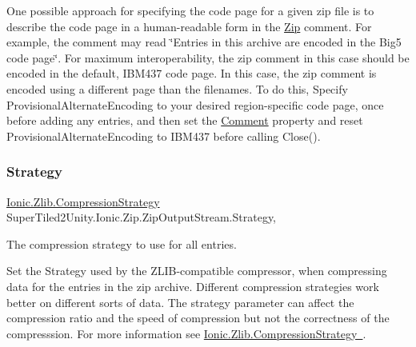 One possible approach for specifying the code page for a given zip file is to describe the code page in a human-\/readable form in the \mbox{\hyperlink{namespace_super_tiled2_unity_1_1_ionic_1_1_zip}{Zip}} comment. For example, the comment may read \char`\"{}\+Entries in this archive are encoded in the
  Big5 code page\char`\"{}. For maximum interoperability, the zip comment in this case should be encoded in the default, I\+B\+M437 code page. In this case, the zip comment is encoded using a different page than the filenames. To do this, Specify {\ttfamily Provisional\+Alternate\+Encoding} to your desired region-\/specific code page, once before adding any entries, and then set the \mbox{\hyperlink{class_super_tiled2_unity_1_1_ionic_1_1_zip_1_1_zip_output_stream_a36027bbb7ea2355884a7922b429a3913}{Comment}} property and reset {\ttfamily Provisional\+Alternate\+Encoding} to I\+B\+M437 before calling {\ttfamily Close()}. \mbox{\label{class_super_tiled2_unity_1_1_ionic_1_1_zip_1_1_zip_output_stream_a14669ca8951ced9c7ce418b0e813b77a}} 
\subsubsection{\texorpdfstring{Strategy}{Strategy}}
{\footnotesize\ttfamily \mbox{\hyperlink{namespace_super_tiled2_unity_1_1_ionic_1_1_zlib_abde5c10a1e2ee453e1e8e22e79a39a3b}{Ionic.\+Zlib.\+Compression\+Strategy}} Super\+Tiled2\+Unity.\+Ionic.\+Zip.\+Zip\+Output\+Stream.\+Strategy\hspace{0.3cm}{\ttfamily [get]}, {\ttfamily [set]}}



The compression strategy to use for all entries. 

Set the Strategy used by the Z\+L\+I\+B-\/compatible compressor, when compressing data for the entries in the zip archive. Different compression strategies work better on different sorts of data. The strategy parameter can affect the compression ratio and the speed of compression but not the correctness of the compresssion. For more information see \mbox{\hyperlink{namespace_super_tiled2_unity_1_1_ionic_1_1_zlib_abde5c10a1e2ee453e1e8e22e79a39a3b}{Ionic.\+Zlib.\+Compression\+Strategy }}. \mbox{\label{class_super_tiled2_unity_1_1_ionic_1_1_zip_1_1_zip_output_stream_a460b67a16c9154f213cdd7eb94e9e3db}} 
